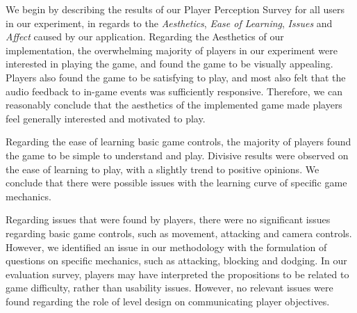 We begin by describing the results of our Player Perception Survey for all users in our experiment, in regards to the \emph{Aesthetics}, \emph{Ease of Learning}, \emph{Issues} and \emph{Affect} caused by our application. Regarding the Aesthetics of our implementation, the overwhelming majority of players in our experiment were interested in playing the game, and found the game to be visually appealing. Players also found the game to be satisfying to play, and most also felt that the audio feedback to in-game events was sufficiently responsive. Therefore, we can reasonably conclude that the aesthetics of the implemented game made players feel generally interested and motivated to play.

Regarding the ease of learning basic game controls, the majority of players found the game to be simple to understand and play. Divisive results were observed on the ease of learning to play, with a slightly trend to positive opinions. We conclude that there were possible issues with the learning curve of specific game mechanics.

Regarding issues that were found by players, there were no significant issues regarding basic game controls, such as movement, attacking and camera controls. However, we identified an issue in our methodology with the formulation of questions on specific mechanics, such as attacking, blocking and dodging. In our evaluation survey, players may have interpreted the propositions to be related to game difficulty, rather than usability issues. However, no relevant issues were found regarding the role of level design on communicating player objectives.

